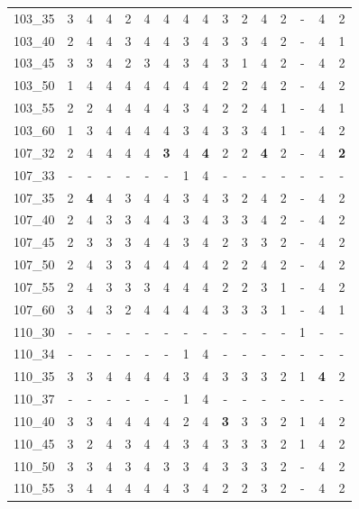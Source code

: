 {\begin{longtable}{lccccccccccccccc}
103\_35 & 3 & 4 & 4 & 2 & 4 & 4 & 4 & 4 & 3 & 2 & 4 & 2 & - & 4 & 2 \\
103\_40 & 2 & 4 & 4 & 3 & 4 & 4 & 3 & 4 & 3 & 3 & 4 & 2 & - & 4 & 1 \\
103\_45 & 3 & 3 & 4 & 2 & 3 & 4 & 3 & 4 & 3 & 1 & 4 & 2 & - & 4 & 2 \\
103\_50 & 1 & 4 & 4 & 4 & 4 & 4 & 4 & 4 & 2 & 2 & 4 & 2 & - & 4 & 2 \\
103\_55 & 2 & 2 & 4 & 4 & 4 & 4 & 3 & 4 & 2 & 2 & 4 & 1 & - & 4 & 1 \\
103\_60 & 1 & 3 & 4 & 4 & 4 & 4 & 3 & 4 & 3 & 3 & 4 & 1 & - & 4 & 2 \\
107\_32 & 2 & 4 & 4 & 4 & 4 & \cellcolor{green!20}\textbf{3} & 4 & \cellcolor{green!20}\textbf{4} & 2 & 2 & \cellcolor{green!20}\textbf{4} & 2 & - & 4 & \cellcolor{green!20}\textbf{2} \\
107\_33 & - & - & - & - & - & - & 1 & 4 & - & - & - & - & - & - & - \\
107\_35 & 2 & \cellcolor{green!20}\textbf{4} & 4 & 3 & 4 & 4 & 3 & 4 & 3 & 2 & 4 & 2 & - & 4 & 2 \\
107\_40 & 2 & 4 & 3 & 3 & 4 & 4 & 3 & 4 & 3 & 3 & 4 & 2 & - & 4 & 2 \\
107\_45 & 2 & 3 & 3 & 3 & 4 & 4 & 3 & 4 & 2 & 3 & 3 & 2 & - & 4 & 2 \\
107\_50 & 2 & 4 & 3 & 3 & 4 & 4 & 4 & 4 & 2 & 2 & 4 & 2 & - & 4 & 2 \\
107\_55 & 2 & 4 & 3 & 3 & 3 & 4 & 4 & 4 & 2 & 2 & 3 & 1 & - & 4 & 2 \\
107\_60 & 3 & 4 & 3 & 2 & 4 & 4 & 4 & 4 & 3 & 3 & 3 & 1 & - & 4 & 1 \\
110\_30 & - & - & - & - & - & - & - & - & - & - & - & - & 1 & - & - \\
110\_34 & - & - & - & - & - & - & 1 & 4 & - & - & - & - & - & - & - \\
110\_35 & 3 & 3 & 4 & 4 & 4 & 4 & 3 & 4 & 3 & 3 & 3 & 2 & 1 & \cellcolor{green!20}\textbf{4} & 2 \\
110\_37 & - & - & - & - & - & - & 1 & 4 & - & - & - & - & - & - & - \\
110\_40 & 3 & 3 & 4 & 4 & 4 & 4 & 2 & 4 & \cellcolor{green!20}\textbf{3} & 3 & 3 & 2 & 1 & 4 & 2 \\
110\_45 & 3 & 2 & 4 & 3 & 4 & 4 & 3 & 4 & 3 & 3 & 3 & 2 & 1 & 4 & 2 \\
110\_50 & 3 & 3 & 4 & 3 & 4 & 3 & 3 & 4 & 3 & 3 & 3 & 2 & - & 4 & 2 \\
110\_55 & 3 & 4 & 4 & 4 & 4 & 4 & 3 & 4 & 2 & 2 & 3 & 2 & - & 4 & 2 \\

\end{longtable}}
